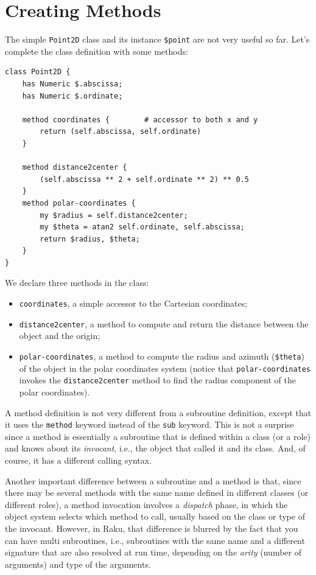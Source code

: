 \section{Creating Methods}

The simple {\tt Point2D} class and its instance \verb'$point' 
are not very useful so far. Let's complete the class definition 
with some methods:

\begin{verbatim}
class Point2D {
    has Numeric $.abscissa;
    has Numeric $.ordinate;
    
    method coordinates {        # accessor to both x and y
        return (self.abscissa, self.ordinate)
    }
    
    method distance2center {
        (self.abscissa ** 2 + self.ordinate ** 2) ** 0.5
    }
    method polar-coordinates {
        my $radius = self.distance2center;
        my $theta = atan2 self.ordinate, self.abscissa;
        return $radius, $theta;
    }
}
\end{verbatim}

We declare three methods in the class:
\begin{itemize}
\item {\tt coordinates}, a simple accessor to the Cartesian 
coordinates;

\item{\tt distance2center}, a method to compute and return 
the distance between the object and the origin;

\item{\tt polar-coordinates}, a method to compute the radius 
and azimuth (\verb'$theta') of the object in the polar 
coordinates system (notice that {\tt polar-coordinates} 
invokes the {\tt distance2center} method to find the radius 
component of the polar coordinates).
\end{itemize}

A method definition is not very different from a subroutine 
definition, except that it uses the {\tt method} keyword 
instead of the {\tt sub} keyword. This is not a surprise 
since a method is essentially a subroutine that is defined 
within a class (or a role) and knows about its 
\emph{invocant}, i.e., the object that called it and its class. 
And, of course, it has a different calling syntax.

Another important difference between a subroutine and a method 
is that, since there may be several methods with the same name 
defined in different classes (or different roles), a method 
invocation involves a \emph{dispatch} phase, in 
which the object system selects which method to call, usually 
based on the class or type of the invocant. However, in 
Raku, that difference is blurred by the fact that you can 
have multi subroutines, i.e., subroutines with the same name 
and a different signature that are also resolved at run time, 
depending on the \emph{arity} (number of arguments) and type of 
the arguments. 

